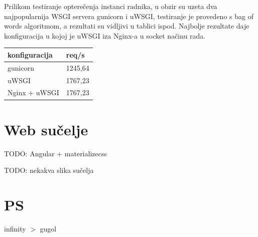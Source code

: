 \documentclass[a4paper,12pt]{article}
\begin{document}
Prilikom testiranje opterečenja instanci radnika, u obzir su uzeta dva najpopularnija WSGI servera gunicorn i uWSGI, testiranje je provedeno s bag of words algoritmom, a rezultati su vidljivi u tablici ispod. Najbolje rezultate daje konfiguracija u kojoj je uWSGI iza Nginx-a u socket načinu rada.
\vspace{0.3cm}
\begin{center}
    \begin{tabular}{ | p{5cm} | p{5cm} |}
    \hline
    konfiguracija & req/s \\ \hline
	gunicorn & 1245,64 \\ \hline
    uWSGI & 1767,23 \\ \hline
    Nginx + uWSGI & 1767,23 \\ \hline
    \end{tabular}
\end{center}

\section{Web sučelje}

TODO: Angular + materializecss

TODO: nekakva slika sučelja

\section{PS}

infinity $>$ gugol



\end{document}
